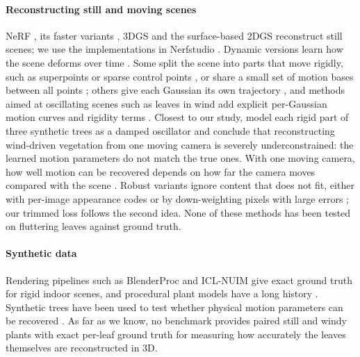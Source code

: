 \documentclass[preprint,11pt,authoryear]{elsarticle}
\begin{document}
\paragraph{Reconstructing still and moving scenes} NeRF \citep{mildenhall2020nerf}, its faster variants \citep{muller2022instant}, 3DGS \citep{kerbl2023gaussian} and the surface-based 2DGS \citep{huang20242dgs} reconstruct still scenes; we use the implementations in Nerfstudio \citep{tancik2023nerfstudio}. Dynamic versions learn how the scene deforms over time \citep{pumarola2021dnerf,luiten2024dynamic,wu20244dgs,yang2024deformable}. Some split the scene into parts that move rigidly, such as superpoints \citep{wan2024superpoint} or sparse control points \citep{huang2024scgs}, or share a small set of motion bases between all points \citep{wang2024shape}; others give each Gaussian its own trajectory \citep{lin2024gaussianflow}, and methods aimed at oscillating scenes such as leaves in wind add explicit per-Gaussian motion curves and rigidity terms \citep{tzathas2026adaptive}. Closest to our study, \citet{chen2026windontrees} model each rigid part of three synthetic trees as a damped oscillator and conclude that reconstructing wind-driven vegetation from one moving camera is severely underconstrained: the learned motion parameters do not match the true ones. With one moving camera, how well motion can be recovered depends on how far the camera moves compared with the scene \citep{gao2022monocular}. Robust variants ignore content that does not fit, either with per-image appearance codes \citep{martinbrualla2021nerfw} or by down-weighting pixels with large errors \citep{sabour2023robustnerf}; our trimmed loss follows the second idea. None of these methods has been tested on fluttering leaves against ground truth.

\paragraph{Synthetic data} Rendering pipelines such as BlenderProc \citep{denninger2023blenderproc2} and ICL-NUIM \citep{handa2014iclnuim} give exact ground truth for rigid indoor scenes, and procedural plant models have a long history \citep{prusinkiewicz1990abop,weber1995trees,runions2007space}. Synthetic trees have been used to test whether physical motion parameters can be recovered \citep{chen2026windontrees}. As far as we know, no benchmark provides paired still and windy plants with exact per-leaf ground truth for measuring how accurately the leaves themselves are reconstructed in 3D.
\end{document}
